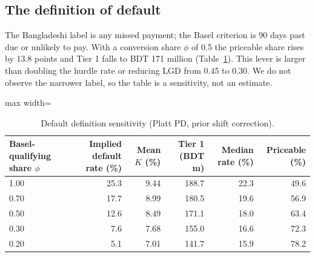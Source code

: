 \documentclass[11pt,a4paper]{article}
\newcommand{\tabsize}{\footnotesize}
\begin{document}
\subsection{The definition of default}
The Bangladeshi label is any missed payment; the Basel criterion is 90 days past due or unlikely to pay. With a conversion share $\phi$ of 0.5 the priceable share rises by 13.8 points and Tier 1 falls to BDT 171 million (Table~\ref{tab:dd}). This lever is larger than doubling the hurdle rate or reducing LGD from 0.45 to 0.30. We do not observe the narrower label, so the table is a sensitivity, not an estimate.
\begin{table}[H]\centering\tabsize\caption{Default definition sensitivity (Platt PD, prior shift correction).}\label{tab:dd}
\begin{adjustbox}{max width=\textwidth}
\begin{tabular}{lrrrrr}
\toprule
Basel-qualifying share $\phi$ & Implied default rate (\%) & Mean $K$ (\%) & Tier 1 (BDT m) & Median rate (\%) & Priceable (\%) \\
\midrule
1.00 & 25.3 & 9.44 & 188.7 & 22.3 & 49.6 \\
0.70 & 17.7 & 8.99 & 180.5 & 19.6 & 56.9 \\
0.50 & 12.6 & 8.49 & 171.1 & 18.0 & 63.4 \\
0.30 & 7.6 & 7.68 & 155.0 & 16.6 & 72.3 \\
0.20 & 5.1 & 7.01 & 141.7 & 15.9 & 78.2 \\
\bottomrule
\end{tabular}
\end{adjustbox}\end{table}
\end{document}
